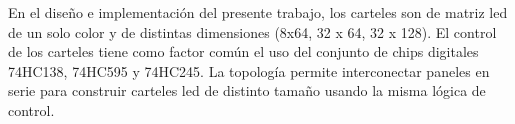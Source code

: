 En el diseño e implementación del presente trabajo, los carteles son de matriz led de un solo color y de distintas dimensiones (8x64, 32 x 64, 32 x 128). El control de los carteles tiene como factor común el uso del conjunto de chips digitales 74HC138, 74HC595 y 74HC245. La topología permite interconectar paneles en serie para construir carteles led de distinto tamaño usando la misma lógica de control. \\


